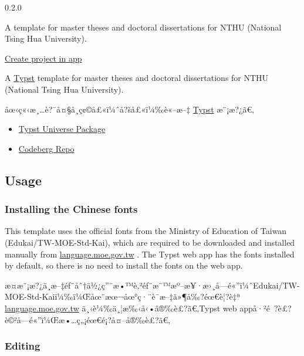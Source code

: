 { 0.2.0 }

A template for master theses and doctoral dissertations for NTHU
(National Tsing Hua University).

\href{/app?template=canonical-nthu-thesis&version=0.2.0}{Create project
in app}

\label{readme}
A \href{https://typst.app/docs/}{Typst} template for master theses and
doctoral dissertations for NTHU (National Tsing Hua University).

åœ‹ç«‹æ¸\ldots è?¯å¤§å­¸ç¢©å£«ï¼ˆå?šå£«ï¼‰è«--æ--‡
\href{https://typst.app/docs/}{Typst} æ¨¡æ?¿ã€‚

\begin{itemize}
\tightlist
\item
  \href{https://typst.app/universe/package/canonical-nthu-thesis}{Typst
  Universe Package}
\item
  \href{https://codeberg.org/kotatsuyaki/canonical-nthu-thesis}{Codeberg
  Repo}
\end{itemize}


\subsection{Usage}\label{usage}

\subsubsection{Installing the Chinese
fonts}\label{installing-the-chinese-fonts}

This template uses the official fonts from the Ministry of Education of
Taiwan (Edukai/TW-MOE-Std-Kai), which are required to be downloaded and
installed manually from
\href{https://language.moe.gov.tw/001/Upload/Files/site_content/M0001/edukai-5.0.zip}{language.moe.gov.tw}
. The Typst web app has the fonts installed by default, so there is no
need to install the fonts on the web app.

æ­¤æ¨¡æ?¿ä¸­æ--‡éƒ¨åˆ†ä½¿ç''¨æ•™è‚²éƒ¨æ¨™æº--æ¥·æ›¸å­---é«''ï¼ˆEdukai/TW-MOE-Std-Kaiï¼‰ï¼Œåœ¨æœ¬åœ°ç·¨è­¯æ--‡ä»¶å‰?éœ€è¦?è‡ª
\href{https://language.moe.gov.tw/001/Upload/Files/site_content/M0001/edukai-5.0.zip}{language.moe.gov.tw}
ä¸‹è¼‰ä¸¦æ‰‹å‹•å®‰è£?ã€‚Typst web
appå·²é~?è£?è©²å­---é«''ï¼Œæ•\ldots ç„¡éœ€é¡?å¤--å®‰è£?ã€‚

\subsubsection{Editing}\label{editing}

